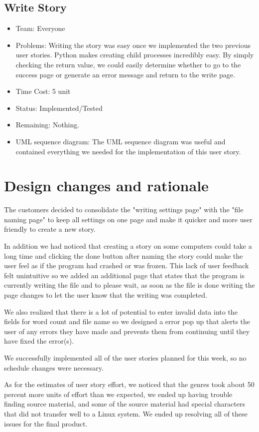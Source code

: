 \documentclass[12pt]{article}
\begin{document}
\subsection{Write Story}
\begin{itemize}
\item Team: Everyone
\item Problems: Writing the story was easy once we implemented the two previous user stories. Python makes creating child processes incredibly easy. By simply checking the return value, we could easily determine whether to go to the success page or generate an error message and return to the write page.
\item Time Cost: 5 unit 
\item Status: Implemented/Tested
\item Remaining: Nothing.
\item UML sequence diagram: The  UML sequence diagram was useful and contained everything we needed for the implementation of this user story.
\end{itemize}

\section{Design changes and rationale}

The customers decided to consolidate the "writing settings page" with the "file naming page" to keep all settings on one page and make it quicker and more user friendly to create a new story. 

In addition we had noticed that creating a story on some computers could take a long time and clicking the done button after naming the story could make the user feel as if the program had crashed or was frozen. This lack of user feedback felt unintuitive so we added an additional page that states that the program is currently writing the file and to please wait, as soon as the file is done writing the page changes to let the user know that the writing was completed.   
 
We also realized that there is a lot of potential to enter invalid data into the fields for word count and file name so we designed a error pop up that alerts the user of any errors they have made and prevents them from continuing until they have fixed the error(s).

We successfully implemented all of the user stories planned for this week, so no schedule changes were necessary.

As for the estimates of user story effort, we noticed that the genres took about 50 percent more units of effort than we expected, we ended up having trouble finding source material, and some of the source material had special characters that did not transfer well to a Linux system. We ended up resolving all of these issues for the final product. 
\end{document}
